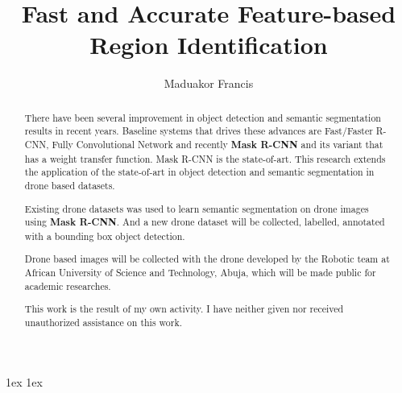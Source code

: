 \documentclass[final,a4paper]{aust_thesis}
\title{%
Fast and Accurate Feature-based Region Identification
}
\author{%
Maduakor Francis
}
\begin{document}
\begin{abstract}%

\noindent There have been several improvement in object detection and semantic segmentation results in recent years. Baseline systems that drives these advances are Fast/Faster R-CNN, Fully Convolutional Network and recently \textbf{Mask R-CNN} and its variant that has a weight transfer function.  Mask R-CNN is the state-of-art.  This research extends the application of the state-of-art in object detection and semantic segmentation in drone based datasets.

Existing drone datasets was used to learn semantic segmentation on drone images using \textbf{Mask R-CNN}. And a new drone dataset will be collected, labelled, annotated with a bounding box object detection.

Drone based images will be collected with the drone developed by the Robotic team at African University of Science and Technology, Abuja, which will be made public for academic researches.

\noindent This work is the result of my own activity. I have neither given nor received unauthorized assistance on this work.


\end{abstract}

\maketitle


{ \baselineskip 1ex
  \parskip 1ex
  \tableofcontents
}


\listoffigures
{}
\cleardoublepage

\listofalgorithms
{}
\cleardoublepage










\appendix



{ \renewcommand{\baselinestretch}{0.8}\normalsize %
  \setlength{\itemsep}{-2.4mm}
  \setlength{\bibspacing}{0.67\baselineskip}
  
  
}
\end{document}
